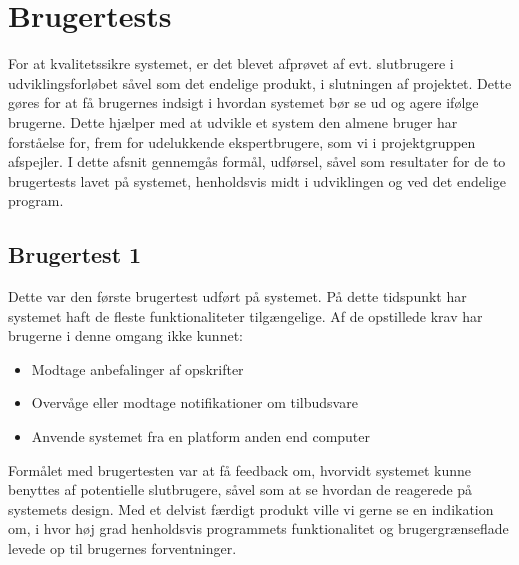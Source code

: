 \section{Brugertests}
For at kvalitetssikre systemet, er det blevet afprøvet af evt. slutbrugere i udviklingsforløbet såvel som det endelige produkt, i slutningen af projektet.
Dette gøres for at få brugernes indsigt i hvordan systemet bør se ud og agere ifølge brugerne.
Dette hjælper med at udvikle et system den almene bruger har forståelse for, frem for udelukkende ekspertbrugere, som vi i projektgruppen afspejler.
I dette afsnit gennemgås formål, udførsel, såvel som resultater for de to brugertests lavet på systemet, henholdsvis midt i udviklingen og ved det endelige program.


\subsection{Brugertest 1}
Dette var den første brugertest udført på systemet.
På dette tidspunkt har systemet haft de fleste funktionaliteter tilgængelige.
Af de opstillede krav har brugerne i denne omgang ikke kunnet:
\begin{itemize}
   \item{Modtage anbefalinger af opskrifter}
   \item{Overvåge eller modtage notifikationer om tilbudsvare}
   \item{Anvende systemet fra en platform anden end computer}
\end{itemize}
Formålet med brugertesten var at få feedback om, hvorvidt systemet kunne benyttes af potentielle slutbrugere, såvel som at se hvordan de reagerede på systemets design.
Med et delvist færdigt produkt ville vi gerne se en indikation om, i hvor høj grad henholdsvis programmets funktionalitet og brugergrænseflade levede op til brugernes forventninger.

